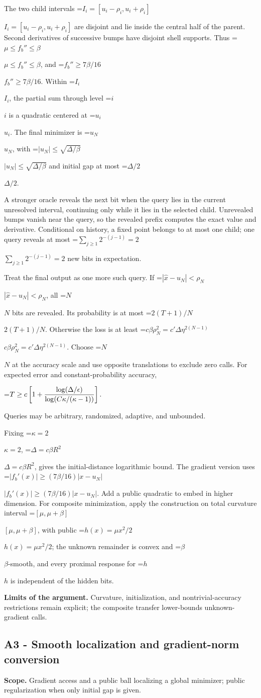 \documentclass[10pt,a4paper]{article}
\newcommand{\AtlasMath}[1]{\par\begingroup\centering\setbox0=\hbox{$\displaystyle #1$}\ifdim\wd0>1.4\linewidth\typeout{ATLAS WIDE FORMULA: \the\wd0}\fi\ifdim\wd0>\linewidth\resizebox{\linewidth}{!}{\box0}\else\box0\fi\par\endgroup}
\newcommand{\AtlasInlineMath}[1]{\begingroup\setbox0=\hbox{$#1$}\ifdim\wd0>.4\linewidth\endgroup\AtlasMath{#1}\else\endgroup$#1$\fi}
\begin{document}
The two child intervals \AtlasInlineMath{I_i=[u_i-\rho_i,u_i+\rho_i]} are disjoint and lie inside the central half of the parent. Second derivatives of successive bumps have disjoint shell supports. Thus \AtlasInlineMath{\mu\le f_b''\le\beta}, and \AtlasInlineMath{f_b''\ge7\beta/16}. Within \AtlasInlineMath{I_i}, the partial sum through level \AtlasInlineMath{i} is a quadratic centered at \AtlasInlineMath{u_i}. The final minimizer is \AtlasInlineMath{u_N}, with \AtlasInlineMath{|u_N|\le\sqrt{\Delta/\beta}} and initial gap at most \AtlasInlineMath{\Delta/2}.

A stronger oracle reveals the next bit when the query lies in the current unresolved interval, continuing only while it lies in the selected child. Unrevealed bumps vanish near the query, so the revealed prefix computes the exact value and derivative. Conditional on history, a fixed point belongs to at most one child; one query reveals at most \AtlasInlineMath{\sum_{j\ge1}2^{-(j-1)}=2} new bits in expectation.

Treat the final output as one more such query. If \AtlasInlineMath{|\widehat x-u_N|<\rho_N}, all \AtlasInlineMath{N} bits are revealed. Its probability is at most \AtlasInlineMath{2(T+1)/N}. Otherwise the loss is at least
\AtlasInlineMath{c\beta\rho_N^2=c'\Delta\eta^{2(N-1)}}.
Choose \AtlasInlineMath{N} at the accuracy scale and use opposite translations to exclude zero calls. For expected error and constant-probability accuracy,

\AtlasMath{T\ge c\left[1+{\log(\Delta/\epsilon)\over
\log(C\kappa/(\kappa-1))}\right].}

Queries may be arbitrary, randomized, adaptive, and unbounded.

Fixing \AtlasInlineMath{\kappa=2}, \AtlasInlineMath{\Delta=c\beta R^2}, gives the initial-distance logarithmic bound. The gradient version uses
\AtlasInlineMath{|f_b'(x)|\ge(7\beta/16)|x-u_N|}.
Add a public quadratic to embed in higher dimension. For composite minimization, apply the construction on total curvature interval \AtlasInlineMath{[\mu,\mu+\beta]}, with public \AtlasInlineMath{h(x)=\mu x^2/2}; the unknown remainder is convex and \AtlasInlineMath{\beta}-smooth, and every proximal response for \AtlasInlineMath{h} is independent of the hidden bits.

\textbf{Limits of the argument.} Curvature, initialization, and nontrivial-accuracy restrictions remain explicit; the composite transfer lower-bounds unknown-gradient calls.

\subsection{A3 - Smooth localization and gradient-norm conversion}
\textbf{Scope.} Gradient access and a public ball localizing a global minimizer; public regularization when only initial gap is given.
\end{document}
